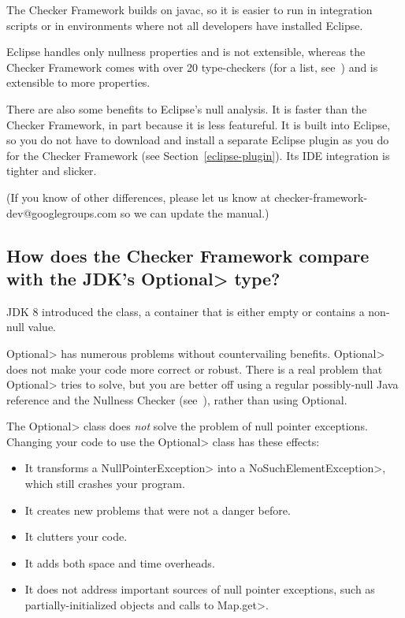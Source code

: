 The Checker Framework builds on javac, so it is easier to run in
integration scripts or in
environments where not all developers have installed Eclipse.

Eclipse handles only nullness properties and is not extensible, whereas the
Checker Framework comes with over 20 type-checkers (for a list,
see~) and is extensible to more properties.

There are also some benefits to Eclipse's null analysis.
It is faster than the Checker Framework, in part because it is less featureful.
It is built into Eclipse, so you do not have to download and install a
separate Eclipse plugin as you do for the Checker Framework (see
Section~\ref{eclipse-plugin}).
Its IDE integration is tighter and slicker.

(If you know of other differences, please let us know at
checker-framework-dev@googlegroups.com so we can update the manual.)


\subsection{How does the Checker Framework compare with the JDK's \<Optional> type?\label{faq-optional}}

JDK 8 introduced the 
class, a container that is either empty or contains a non-null value.

\<Optional> has numerous problems without countervailing benefits.
\<Optional> does not make your code more correct or robust. There is a real
problem that \<Optional> tries to solve, but you are better off using a
regular possibly-null Java reference and the Nullness Checker
(see~), rather than using Optional.

The \<Optional> class does \emph{not} solve the problem of null pointer
exceptions.  Changing your code to use the \<Optional> class has these effects:

\begin{itemize}
\item
It transforms a \<NullPointerException> into a \<NoSuchElementException>,
which still crashes your program.
\item
It creates new problems that were not a danger before.
\item
It clutters your code.
\item
It adds both space and time overheads.
\item
It does not address important sources of null pointer exceptions, such as
partially-initialized objects and calls to \<Map.get>.
\end{itemize}

